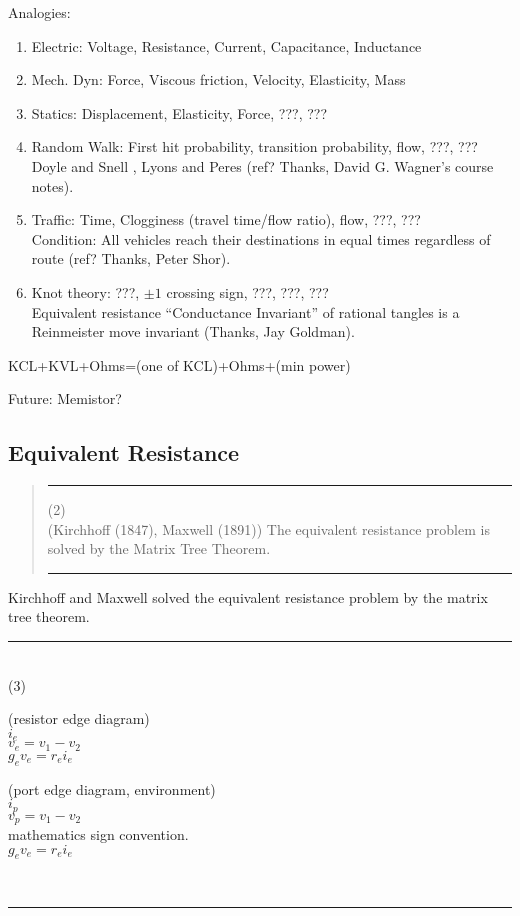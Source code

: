 \documentclass{article}
\begin{document}
Analogies:
\begin{enumerate}
\item Electric: Voltage, Resistance, Current, Capacitance, Inductance
\item Mech. Dyn: Force, Viscous friction, Velocity, Elasticity, Mass
\item Statics: Displacement, Elasticity, Force,  ???, ???
\item Random Walk: First hit probability, transition probability, flow, ???, ??? \\
Doyle and Snell \cite{DoyleSnellRandom},
Lyons and Peres \cite{ProbOnTreesNetworks}
(ref? Thanks, David G. Wagner's course notes).
\item Traffic: Time, Clogginess (travel time/flow ratio), flow, ???, ???\\
Condition: All vehicles reach their destinations in equal times regardless of 
route (ref? Thanks, Peter Shor).
\item Knot theory: ???, $\pm 1$ crossing sign, ???, ???, ???\\
Equivalent resistance ``Conductance Invariant'' of rational tangles is a 
Reinmeister move 
invariant\cite{RationalTangles} (Thanks, Jay Goldman).
\end{enumerate}

KCL+KVL+Ohms=(one of KCL)+Ohms+(min power)


Future: Memistor?


\subsection{Equivalent Resistance}




\pagebreak[3] \begin{quote}\rule{\textwidth}{3pt}
(2)\\
(Kirchhoff (1847), Maxwell (1891)) The equivalent resistance problem
is solved by
the Matrix Tree Theorem.
 
\rule{\textwidth}{3pt}
\end{quote}


Kirchhoff\cite{Kirchhoff} and 
Maxwell\cite{MaxR} solved the equivalent resistance problem
by the matrix tree theorem.


\rule{\textwidth}{3pt}\\
(3)\\
\begin{minipage}{.4\textwidth}
(resistor edge diagram)\\
$i_e$\\
$v_e=v_1-v_2$\\
$g_ev_e=r_ei_e$
\end{minipage}
\begin{minipage}{.4\textwidth}
(port edge diagram, environment)\\
$i_p$\\
$v_p=v_1-v_2$\\
mathematics sign convention.\\
$g_ev_e=r_ei_e$
\end{minipage}\\
\rule{\textwidth}{3pt}\\
\end{document}
